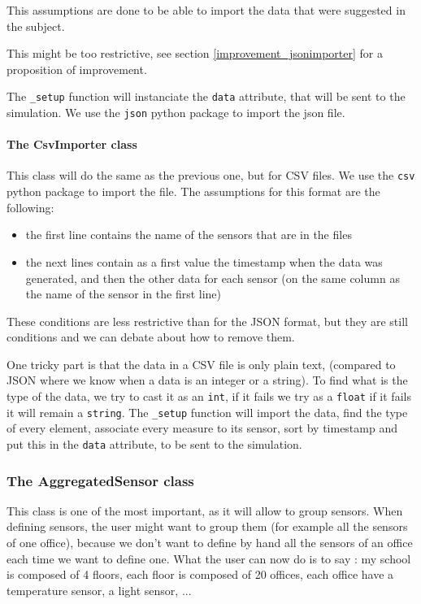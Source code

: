 This assumptions are done to be able to import the data that were suggested in
the subject.

This might be too restrictive, see section \ref{improvement_jsonimporter} for a
proposition of improvement.

The \verb!_setup! function will instanciate the \verb!data! attribute, that
will be sent to the simulation. We use the \verb!json! python package to import
the json file.

\paragraph{The CsvImporter class}

This class will do the same as the previous one, but for CSV files. We use the
\verb!csv! python package to import the file. The assumptions for this format
are the following:
\begin{itemize}
\item the first line contains the name of the sensors that are in the files
\item the next lines contain as a first value the timestamp when the data was
generated, and then the other data for each sensor (on the same column as the
name of the sensor in the first line)
\end{itemize}

These conditions are less restrictive than for the JSON format, but they are
still conditions and we can debate about how to remove them.

One tricky part is that the data in a CSV file is only plain text, (compared
to JSON where we know when a data is an integer or a string). To find what
is the type of the data, we try to cast it as an \verb!int!, if it fails
we try as a \verb!float! if it fails it will remain a \verb!string!. The
\verb!_setup! function will import the data, find the type of every element,
associate every measure to its sensor, sort by timestamp and put this in the
\verb!data! attribute, to be sent to the simulation.

\subsubsection{The AggregatedSensor class}

This class is one of the most important, as it will allow to group
sensors. When defining sensors, the user might want to group them (for example
all the sensors of one office), because we don't want to define by hand all
the sensors of an office each time we want to define one. What the user can now
do is to say : my school is composed of 4 floors, each floor is composed of 20
offices, each office have a temperature sensor, a light sensor, ...

